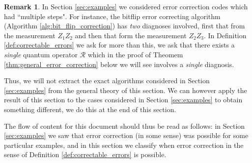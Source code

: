\documentclass[12pt]{article}
\theoremstyle{plain}
\theoremstyle{definition}
\newtheorem{remark}[thm]{Remark}
\newcommand{\call}[1]{\mathcal{#1}}
\begin{document}
\begin{remark}\label{rmk:discrepancy}
	In Section \ref{sec:examples} we considered error correction codes which had ``multiple steps". For instance, the bitflip error correcting algorithm (Algorithm \ref{alg:bit_flip_correction}) has \emph{two} diagnoses involved, first that from the measurement $Z_1Z_2$ and then that form the measurement $Z_2Z_3$. In Definition \ref{def:correctable_errors} we ask for more than this, we ask that there exists a \emph{single} quantum operator $\call{R}$ which in the proof of Theomem \ref{thm:general_error_correction} below we will see involves a \emph{single} diagnosis.
	
	Thus, we will not extract the exact algorithms considered in Section \ref{sec:examples} from the general theory of this section. We can however apply the result of this section to the cases considered in Section \ref{sec:examples} to obtain something different, we do this at the end of this section.
	
	The flow of content for this document should thus be read as follows: in Section \ref{sec:examples} we saw that error correction (in some sense) was possible for some particular examples, and in this section we classify when error correction in the sense of Definition \ref{def:correctable_errors} is possible.
	\end{remark}
	
\end{document}
